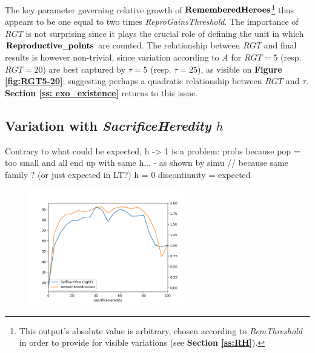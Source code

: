 \documentclass[a4paper,12pt]{report}
\begin{document}
The key parameter governing relative growth of $\bf{RememberedHeroes}$\footnote{
This output's absolute value is arbitrary, chosen according to \emph{RemThreshold} in
order to provide for visible variations (see \textbf{Section \ref{ss:RH}}).
} thus appears to be one equal to two times
\emph{ReproGainsThreshold}. The importance of $RGT$ is not surprising since it plays
the crucial role of defining the unit in which $\bf{Reproductive\_points}$ are counted.  
The relationship between $RGT$ and final results is however non-trivial, since 
variation according to $A$ for $RGT=5$ (resp. $RGT=20$) are best captured by $\tau=5$
(resp. $\tau=25$), as visible on \textbf{Figure \ref{fig:RGT5-20}}; suggesting perhaps
a quadratic relationship between $RGT$ and $\tau$. \textbf{Section \ref{ss: exo_existence}}
returns to this issue.

\subsection{Variation with \emph{SacrificeHeredity} $h$}

Contrary to what could be expected, h -> 1 is a problem: probs because pop = too small
and all end up with same h... - as shown by simu // because same family ? (or just expected in LT?)
h = 0 discontinuity = expected

\begin{figure}[h]
    \centering
    \includegraphics[width=0.6\textwidth]{Hered_a50}
    \caption{}
    \label{fig:h}
    \end{figure}



\end{document}
